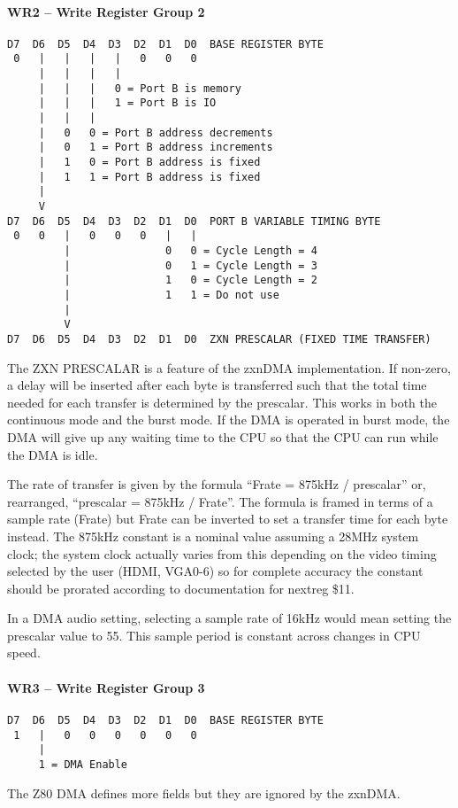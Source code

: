 \paragraph{WR2 – Write Register Group 2}
\begin{verbatim}
D7  D6  D5  D4  D3  D2  D1  D0  BASE REGISTER BYTE
 0   |   |   |   |   0   0   0
     |   |   |   |
     |   |   |   0 = Port B is memory
     |   |   |   1 = Port B is IO
     |   |   |
     |   0   0 = Port B address decrements
     |   0   1 = Port B address increments
     |   1   0 = Port B address is fixed
     |   1   1 = Port B address is fixed
     |
     V
D7  D6  D5  D4  D3  D2  D1  D0  PORT B VARIABLE TIMING BYTE
 0   0   |   0   0   0   |   |
         |               0   0 = Cycle Length = 4
         |               0   1 = Cycle Length = 3
         |               1   0 = Cycle Length = 2
         |               1   1 = Do not use
         |
         V
D7  D6  D5  D4  D3  D2  D1  D0  ZXN PRESCALAR (FIXED TIME TRANSFER)
\end{verbatim}
The ZXN PRESCALAR is a feature of the zxnDMA implementation. If
non-zero, a delay will be inserted after each byte is transferred such
that the total time needed for each transfer is determined by the
prescalar. This works in both the continuous mode and the burst
mode. If the DMA is operated in burst mode, the DMA will give up any
waiting time to the CPU so that the CPU can run while the DMA is idle.

The rate of transfer is given by the formula ``Frate = 875kHz /
prescalar'' or, rearranged, ``prescalar = 875kHz / Frate''. The formula
is framed in terms of a sample rate (Frate) but Frate can be inverted
to set a transfer time for each byte instead. The 875kHz constant is a
nominal value assuming a 28MHz system clock; the system clock actually
varies from this depending on the video timing selected by the user
(HDMI, VGA0-6) so for complete accuracy the constant should be
prorated according to documentation for nextreg \$11.

In a DMA audio setting, selecting a sample rate of 16kHz would mean
setting the prescalar value to 55. This sample period is constant
across changes in CPU speed.

\paragraph{WR3 – Write Register Group 3}
\begin{verbatim}
D7  D6  D5  D4  D3  D2  D1  D0  BASE REGISTER BYTE
 1   |   0   0   0   0   0   0
     |
     1 = DMA Enable
\end{verbatim}
The Z80 DMA defines more fields but they are ignored by the zxnDMA.

